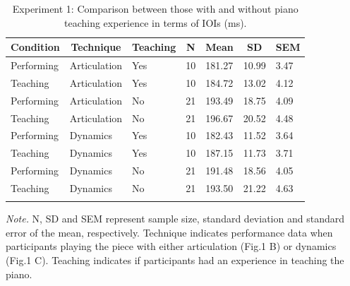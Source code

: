 \documentclass[
  man,floatsintext]{apa6}
\begin{document}
\begin{table}[tbp]

\begin{center}
\begin{threeparttable}

\caption{\label{tab:ioi-teaching-desc-1}Experiment 1: Comparison between those with and without piano teaching experience in terms of IOIs (ms).}

\begin{tabular}{lllllll}
\toprule
Condition & \multicolumn{1}{c}{Technique} & \multicolumn{1}{c}{Teaching} & \multicolumn{1}{c}{N} & \multicolumn{1}{c}{Mean} & \multicolumn{1}{c}{SD} & \multicolumn{1}{c}{SEM}\\
\midrule
Performing & Articulation & Yes & 10 & 181.27 & 10.99 & 3.47\\
Teaching & Articulation & Yes & 10 & 184.72 & 13.02 & 4.12\\
Performing & Articulation & No & 21 & 193.49 & 18.75 & 4.09\\
Teaching & Articulation & No & 21 & 196.67 & 20.52 & 4.48\\
Performing & Dynamics & Yes & 10 & 182.43 & 11.52 & 3.64\\
Teaching & Dynamics & Yes & 10 & 187.15 & 11.73 & 3.71\\
Performing & Dynamics & No & 21 & 191.48 & 18.56 & 4.05\\
Teaching & Dynamics & No & 21 & 193.50 & 21.22 & 4.63\\
\bottomrule
\addlinespace
\end{tabular}

\begin{tablenotes}[para]
\normalsize{\textit{Note.} N, SD and SEM represent sample size, standard deviation and standard error of the mean, respectively. Technique indicates performance data when participants playing the piece with either articulation (Fig.1 B) or dynamics (Fig.1 C). Teaching indicates if participants had an experience in teaching the piano.}
\end{tablenotes}

\end{threeparttable}
\end{center}

\end{table}
\end{document}
